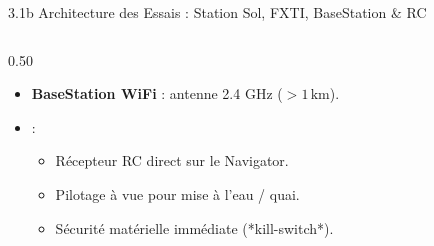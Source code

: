 \begin{frame}{3.1b Architecture des Essais : Station Sol, FXTI, BaseStation \& RC}
\begin{columns}[c]
\begin{column}{0.50\textwidth}
      \begin{block}{}
        \begin{itemize}
          \item \textbf{BaseStation WiFi} : antenne 2.4 GHz ($>1\,\text{km}$).
          \item {} :
            \begin{itemize}
              \item Récepteur RC direct sur le Navigator.
              \item Pilotage à vue pour mise à l'eau / quai.
              \item Sécurité matérielle immédiate (*kill-switch*).
            \end{itemize}
        \end{itemize}
      \end{block}
    \end{column}
  \end{columns}
\end{frame}

